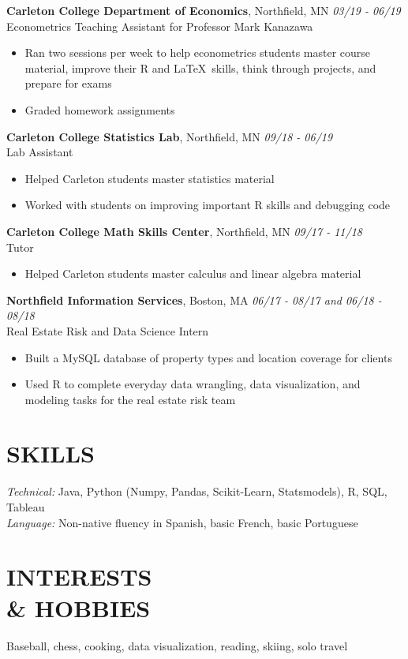 \documentclass[margin, 10pt]{res} %
\begin{document}
\begin{resume}
{\sl} \textbf{Carleton College Department of Economics}, Northfield, MN \hfill \textit{03/19 - 06/19}\\
{\sl} Econometrics Teaching Assistant for Professor Mark Kanazawa\smallskip
{\sl} \begin{itemize}
	\item Ran two sessions per week to help econometrics students master course material, improve their R and \LaTeX \ skills, think through projects, and prepare for exams
	\item Graded homework assignments
\end{itemize}


{\sl} \textbf{Carleton College Statistics Lab}, Northfield, MN \hfill \textit{09/18 - 06/19}\\
{\sl} Lab Assistant \smallskip
{\sl} \begin{itemize}
\item Helped Carleton students master statistics material
\item Worked with students on improving important R skills and debugging code
\end{itemize}

{\sl} \textbf{Carleton College Math Skills Center}, Northfield, MN \hfill \textit{09/17 - 11/18}\\
{\sl} Tutor \smallskip
{\sl} \begin{itemize}
\item Helped Carleton students master calculus and linear algebra material
\end{itemize}

{\sl} \textbf{Northfield Information Services}, Boston, MA \hfill \textit{06/17 - 08/17 and 06/18 - 08/18}\\
{\sl} Real Estate Risk and Data Science Intern \smallskip
{\sl} \begin{itemize}
\item Built a MySQL database of property types and location coverage for clients
\item Used R to complete everyday data wrangling, data visualization, and modeling tasks for the real estate risk team
\end{itemize}


\section{SKILLS}
{\sl Technical:} Java, Python (Numpy, Pandas, Scikit-Learn, Statsmodels), R, SQL, Tableau\\ \smallskip
{\sl Language:} Non-native fluency in Spanish, basic French, basic Portuguese

\section{INTERESTS \\\& HOBBIES}
{\sl} Baseball, chess, cooking, data visualization, reading, skiing, solo travel

\end{resume}
\end{document}
